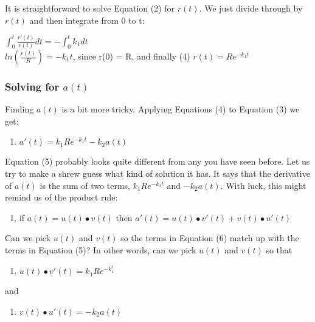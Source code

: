 \documentclass[]{article}
\providecommand{\tightlist}{%
  \setlength{\itemsep}{0pt}\setlength{\parskip}{0pt}}
\begin{document}
It is straightforward to solve Equation (2) for \(r(t)\). We just divide
through by \(r(t)\) and then integrate from 0 to t:

\(\int_0^t \frac{r'(t)}{r(t)} dt= - \int_0^t k_1dt\)\\
\(ln(\frac{r(t)}{R}) = -k_1t\), since r(0) = R, and finally (4)
\(r(t) = Re^{-k_1t}\)

\subsubsection{\texorpdfstring{Solving for
\(a(t)\)}{Solving for a(t)}}\label{solving-for-at}

Finding \(a(t)\) is a bit more tricky. Applying Equations (4) to
Equation (3) we get:

\begin{enumerate}
\def\labelenumi{(\arabic{enumi})}
\setcounter{enumi}{4}
\tightlist
\item
  \(a'(t) = k_1Re^{-k_1t}-k_2a(t)\)
\end{enumerate}

Equation (5) probably looks quite different from any you have seen
before. Let us try to make a shrew guess what kind of solution it has.
It says that the derivative of \(a(t)\) is the sum of two terms,
\(k_1Re^{-k_1t}\) and \(-k_2a(t)\). With luck, this might remind us of
the product rule:

\begin{enumerate}
\def\labelenumi{(\arabic{enumi})}
\setcounter{enumi}{5}
\tightlist
\item
  if \(a(t) = u(t) \bullet v(t)\) then
  \(a'(t) = u(t) \bullet v'(t) + v(t) \bullet u'(t)\)
\end{enumerate}

Can we pick \(u(t)\) and \(v(t)\) so the terms in Equation (6) match up
with the terms in Equation (5)? In other words, can we pick \(u(t)\) and
\(v(t)\) so that

\begin{enumerate}
\def\labelenumi{(\arabic{enumi})}
\setcounter{enumi}{6}
\tightlist
\item
  \(u(t) \bullet v'(t) = k_1Re^{-k_1^t}\)
\end{enumerate}

and

\begin{enumerate}
\def\labelenumi{(\arabic{enumi})}
\setcounter{enumi}{7}
\tightlist
\item
  \(v(t) \bullet u'(t) = -k_2a(t)\)
\end{enumerate}
\end{document}
